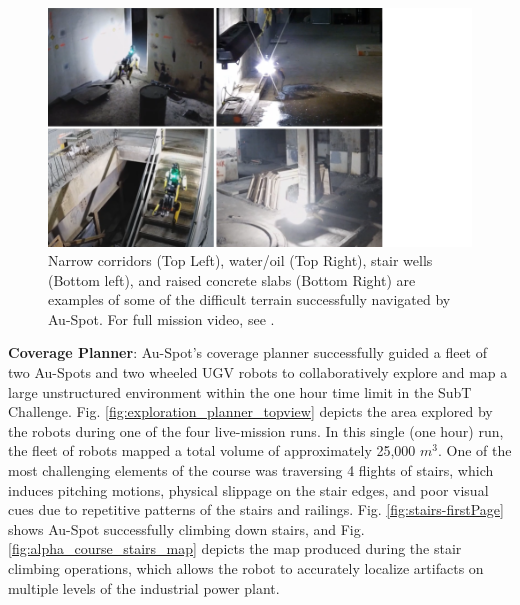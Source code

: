 \documentclass[letterpaper, 10pt, conference]{ieeeconf}      %
\newcommand{\ph}[1]{{\textbf{#1}:}} %
\newcommand{\rev}[1]{{\color{blue}#1}} %
\begin{document}
\begin{figure}[t]
  \centering
  \includegraphics[width=\linewidth,trim={0cm 0cm 7cm 0cm},clip]{spot_iros/graphics/trav_examples.png}
  \caption{Narrow corridors (Top Left), water/oil (Top Right), stair wells (Bottom left), and raised concrete slabs (Bottom Right) are examples of some of the difficult terrain successfully navigated by Au-Spot. For full mission video, see \cite{spot_urban_video}.}
  \label{fig:trav_exp}
\end{figure}

\ph{Coverage Planner}
Au-Spot's coverage planner successfully guided a fleet of two Au-Spots and two wheeled UGV robots to collaboratively explore and map a large unstructured environment within the one hour time limit in the SubT Challenge. Fig. \ref{fig:exploration_planner_topview} depicts the area explored by the robots during one of the four live-mission runs. In this single (one hour) run, the fleet of robots mapped a total volume of approximately 25,000 ${m}^{3}$. %
One of the most challenging elements of the course was traversing 4 flights of stairs, which induces pitching motions, physical slippage on the stair edges, and poor visual cues due to repetitive patterns of the stairs and railings. Fig. \ref{fig:stairs-firstPage} shows Au-Spot successfully climbing down stairs, and Fig. \ref{fig:alpha_course_stairs_map} depicts the map produced during the stair climbing operations, which allows the robot to accurately localize artifacts on multiple levels of the industrial power plant.



\end{document}
